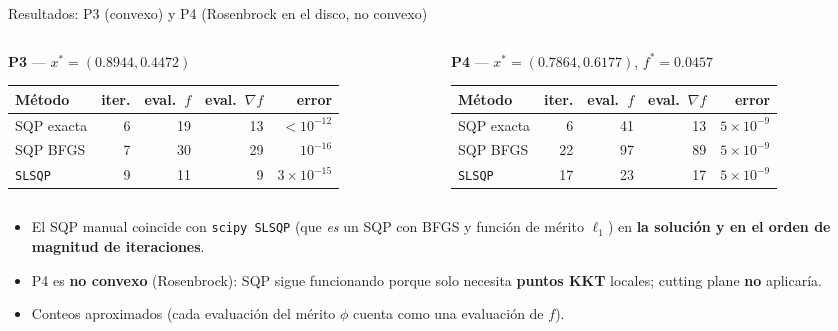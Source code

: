 \documentclass[aspectratio=169]{beamer}
\newcommand{\grad}{\nabla}
\newcommand{\xs}{x^\ast}
\begin{document}
\begin{frame}{Resultados: P3 (convexo) y P4 (Rosenbrock en el disco, no convexo)}
  \scriptsize
  \begin{columns}[T]
    \begin{column}{0.49\textwidth}
      \textbf{P3} --- $\xs=(0.8944,0.4472)$
      \begin{center}
      \begin{tabular}{lrrrr}
        \toprule
        Método & iter. & eval.\ $f$ & eval.\ $\grad f$ & error\\
        \midrule
        SQP exacta & 6 & 19 & 13 & $<10^{-12}$\\
        SQP BFGS & 7 & 30 & 29 & $10^{-16}$\\
        \texttt{SLSQP} & 9 & 11 & 9 & $3\!\times\!10^{-15}$\\
        \bottomrule
      \end{tabular}
      \end{center}
    \end{column}
    \begin{column}{0.49\textwidth}
      \textbf{P4} --- $\xs=(0.7864,0.6177)$, $f^\ast=0.0457$
      \begin{center}
      \begin{tabular}{lrrrr}
        \toprule
        Método & iter. & eval.\ $f$ & eval.\ $\grad f$ & error\\
        \midrule
        SQP exacta & 6 & 41 & 13 & $5\!\times\!10^{-9}$\\
        SQP BFGS & 22 & 97 & 89 & $5\!\times\!10^{-9}$\\
        \texttt{SLSQP} & 17 & 23 & 17 & $5\!\times\!10^{-9}$\\
        \bottomrule
      \end{tabular}
      \end{center}
    \end{column}
  \end{columns}
  \normalsize
  \vspace{0.2cm}
  \begin{itemize}
    \item El SQP manual coincide con \texttt{scipy SLSQP} (que \emph{es} un SQP con BFGS y función de mérito $\ell_1$) en \textbf{la solución y en el orden de magnitud de iteraciones}.
    \item P4 es \textbf{no convexo} (Rosenbrock): SQP sigue funcionando porque solo necesita \textbf{puntos KKT} locales; cutting plane \textbf{no} aplicaría.
    \item Conteos aproximados (cada evaluación del mérito $\phi$ cuenta como una evaluación de $f$).
  \end{itemize}
\end{frame}
\end{document}
